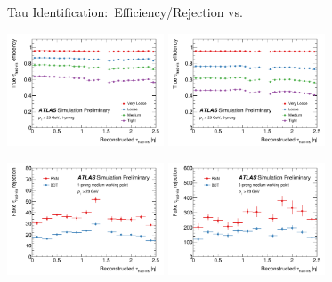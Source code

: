 \documentclass[11pt, xcolor={dvipsnames}, aspectratio=169]{beamer}
\begin{document}
\begin{frame}{Tau Identification:\ Efficiency/Rejection vs.\ \allbold{$\eta$}}
  \centering

  \includegraphics[width=0.35\textwidth]{tauid/pubnote/eff_vs_eta_1p}%
  \includegraphics[width=0.35\textwidth]{tauid/pubnote/eff_vs_eta_3p}%

  \includegraphics[width=0.35\textwidth]{tauid/pubnote/rej_vs_eta_1p}%
  \includegraphics[width=0.35\textwidth]{tauid/pubnote/rej_vs_eta_3p}%
\end{frame}

\end{document}
